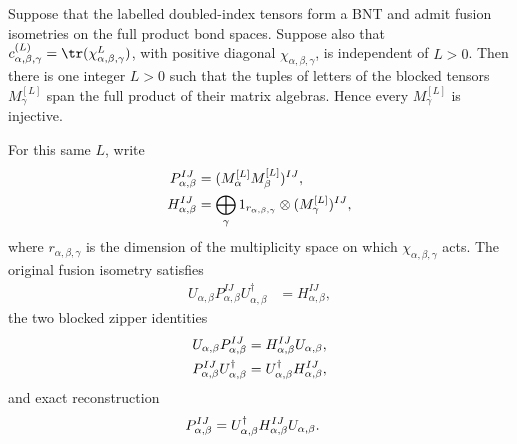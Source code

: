 \begin{lemma}
    \label{thm:mpdo_bnt_common_positive_blocked_fusion}
    \leanok
    Suppose that the labelled doubled-index tensors form a BNT and admit
    fusion isometries on the full product bond spaces. Suppose also that
    $c_{\alpha,\beta,\gamma}^{(L)}
        =\tr(\chi_{\alpha,\beta,\gamma}^{L})$, with positive diagonal
    $\chi_{\alpha,\beta,\gamma}$, is independent of $L>0$. Then there is
    one integer $L>0$ such that the tuples of letters of the blocked tensors
    $M_\gamma^{[L]}$ span the full product of their matrix algebras.
    Hence every $M_\gamma^{[L]}$ is injective.

    For this same $L$, write
    \begin{align}
        P_{\alpha,\beta}^{IJ}
         & =(M_\alpha^{[L]}M_\beta^{[L]})^{IJ},
        \notag                                  \\
        H_{\alpha,\beta}^{IJ}
         & =\bigoplus_\gamma
        1_{r_{\alpha,\beta,\gamma}}
        \otimes(M_\gamma^{[L]})^{IJ},
        \notag
    \end{align}
    where $r_{\alpha,\beta,\gamma}$ is the dimension of the multiplicity
    space on which $\chi_{\alpha,\beta,\gamma}$ acts.
    The original fusion isometry satisfies
    \begin{align}
        U_{\alpha,\beta}P_{\alpha,\beta}^{IJ}
        U_{\alpha,\beta}^\dagger
         & =H_{\alpha,\beta}^{IJ},
        \label{eq:rfp_blocked_fusion}
    \end{align}
    the two blocked zipper identities
    \begin{align}
        U_{\alpha,\beta}P_{\alpha,\beta}^{IJ}
         & =H_{\alpha,\beta}^{IJ}U_{\alpha,\beta},
        \notag                                              \\
        P_{\alpha,\beta}^{IJ}U_{\alpha,\beta}^\dagger
         & =U_{\alpha,\beta}^\dagger H_{\alpha,\beta}^{IJ},
        \notag
    \end{align}
    and exact reconstruction
    \begin{align}
        P_{\alpha,\beta}^{IJ}
         & =U_{\alpha,\beta}^\dagger
        H_{\alpha,\beta}^{IJ}U_{\alpha,\beta}.
        \notag
    \end{align}
\end{lemma}


